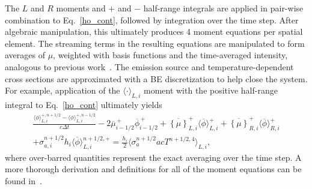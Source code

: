 \documentclass{anstrans}
\newcommand{\mom}[1]{\langle #1 \rangle}
\newcommand{\phibar}{\ensuremath{\overline{\phi}}}
\newcommand{\cur}[1]{\left\{ #1 \right\}}
\begin{document}
The $L$ and $R$ moments and $+$ and $-$ half-range integrals are applied in pair-wise combination to
Eq.~\eqref{ho_cont}, followed by integration over the time step.  After algebraic manipulation, this
ultimately produces 4 moment equations per spatial element.  The streaming terms 
in the resulting equations are manipulated to form averages of $\mu$, weighted with basis functions
and the time-averaged intensity, analogous to previous work~\cite{bolding_nse,wolters}. 
The emission source and temperature-dependent cross sections are approximated with a BE discretization to help close the system.
For example, application of the $\mom{\cdot}_{L,i}$ moment with the positive half-range integral to
Eq.~\eqref{ho_cont} ultimately yields
\begin{multline}\label{eq:t_moml_ex}
    \frac{\mom{\phi}_{L,i}^{+,n+1/2} - \mom{\phi}_{L,i}^{+,n-1/2}}{c \Delta t}
    -2\overline {\mu}_{i-1/2}^{\,+} \overline \phi_{i-1/2}^{\,+} + \overline{\cur {\mu}}_{L,i}^{+}
  \mom{\phibar}_{L,i}^{+}
  +  \overline{\cur\mu}_{R,i}^{+}
  \mom{\phibar}_{R,i}^{+} \\+  \sigma_{a,i}^{n+1/2} h_i 
  \mom{\overline\phi}_{L,i}^{n+1/2,+}  = \frac{h_i}{2} \mom{\sigma_a^{n+1/2} a c T^{n+1/2,4}}_{L,i},
\end{multline}
where over-barred quantities represent the exact averaging over the time step.
A more thorough derivation and definitions for all of the  moment equations can be found in~\cite{dissertation}.
\end{document}
